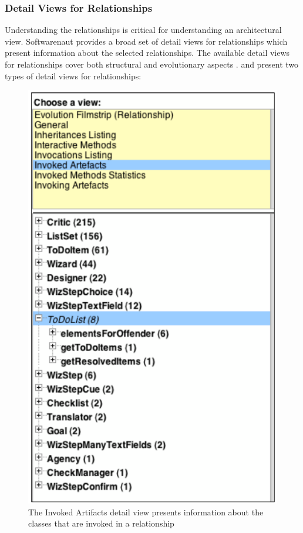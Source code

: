 \documentclass[preprint,12pt]{elsarticle}
\begin{document}
\subsubsection {Detail Views for Relationships}

Understanding the relationships is critical for understanding an architectural view. Softwarenaut provides a broad set of detail views for relationships which present information about the selected relationships. The available detail views for relationships cover both structural and evolutionary aspects \cite{lungu-cutedge, lungu-relevo}.  and  present two types of detail views for relationships: 

\begin{figure}[h]
\begin{center}
\includegraphics[width=0.44\linewidth]{DetailsForEdgesAndNodes}
\caption{The Invoked Artifacts detail view presents information about the classes that are invoked in a relationship} 
\end{center}
\end{figure}
\end{document}
